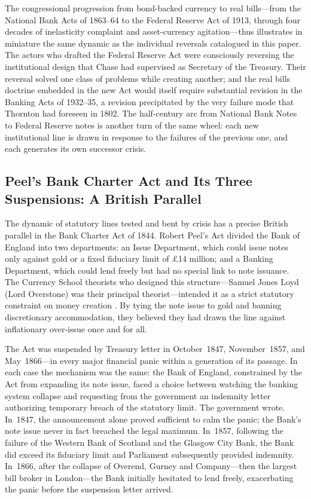 \documentclass[12pt]{article}
\begin{document}
The congressional progression from bond-backed currency to real
bills---from the National Bank Acts of 1863--64 to the Federal Reserve
Act of 1913, through four decades of inelasticity complaint and
asset-currency agitation---thus illustrates in miniature the same
dynamic as the individual reversals catalogued in this paper.  The
actors who drafted the Federal Reserve Act were consciously reversing
the institutional design that Chase had supervised as Secretary of the
Treasury.  Their reversal solved one class of problems while creating
another; and the real bills doctrine embedded in the new Act would
itself require substantial revision in the Banking Acts of 1932--35,
a revision precipitated by the very failure mode that Thornton had
foreseen in 1802.  The half-century arc from National Bank Notes to
Federal Reserve notes is another turn of the same wheel: each new
institutional line is drawn in response to the failures of the previous
one, and each generates its own successor crisis.

\subsection{Peel's Bank Charter Act and Its Three Suspensions:
            A British Parallel}
\label{subsec:peel}

The dynamic of statutory lines tested and bent by crisis has a precise
British parallel in the Bank Charter Act of 1844.  Robert Peel's Act
divided the Bank of England into two departments: an Issue Department,
which could issue notes only against gold or a fixed fiduciary limit of
\pounds 14 million; and a Banking Department, which could lend freely
but had no special link to note issuance.  The Currency School theorists
who designed this structure---Samuel Jones Loyd (Lord Overstone) was
their principal theorist---intended it as a strict statutory
constraint on money creation \citep{Fetter1965}.  By tying the note
issue to gold and banning discretionary accommodation, they believed they
had drawn the line against inflationary over-issue once and for all.

The Act was suspended by Treasury letter in October~1847,
November~1857, and May~1866---in every major financial panic within a
generation of its passage.  In each case the mechanism was the same:
the Bank of England, constrained by the Act from expanding its note
issue, faced a choice between watching the banking system collapse and
requesting from the government an indemnity letter authorizing temporary
breach of the statutory limit.  The government wrote.  In~1847, the
announcement alone proved sufficient to calm the panic; the Bank's note
issue never in fact breached the legal maximum.  In~1857, following the
failure of the Western Bank of Scotland and the Glasgow City Bank, the
Bank did exceed its fiduciary limit and Parliament subsequently provided
indemnity.  In~1866, after the collapse of Overend, Gurney
and Company---then the largest bill broker in London---the Bank
initially hesitated to lend freely, exacerbating the panic before the
suspension letter arrived.
\end{document}
